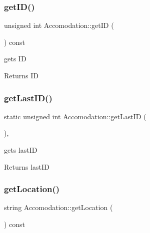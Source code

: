 \subsubsection{\texorpdfstring{get\+I\+D()}{getID()}}
{\footnotesize\ttfamily unsigned int Accomodation\+::get\+ID (\begin{DoxyParamCaption}{ }\end{DoxyParamCaption}) const\hspace{0.3cm}{\ttfamily [inline]}}



gets ID 

\begin{DoxyReturn}{Returns}
ID 
\end{DoxyReturn}
\hypertarget{class_accomodation_a2ceca7929ed995f3fdc40e3d6b7e017c}{}\label{class_accomodation_a2ceca7929ed995f3fdc40e3d6b7e017c} 
\subsubsection{\texorpdfstring{get\+Last\+I\+D()}{getLastID()}}
{\footnotesize\ttfamily static unsigned int Accomodation\+::get\+Last\+ID (\begin{DoxyParamCaption}{ }\end{DoxyParamCaption})\hspace{0.3cm}{\ttfamily [inline]}, {\ttfamily [static]}}



gets last\+ID 

\begin{DoxyReturn}{Returns}
last\+ID 
\end{DoxyReturn}
\hypertarget{class_accomodation_a4412dad54b791d4db1ebd01176c1333e}{}\label{class_accomodation_a4412dad54b791d4db1ebd01176c1333e} 
\subsubsection{\texorpdfstring{get\+Location()}{getLocation()}}
{\footnotesize\ttfamily string Accomodation\+::get\+Location (\begin{DoxyParamCaption}{ }\end{DoxyParamCaption}) const\hspace{0.3cm}{\ttfamily [inline]}}



